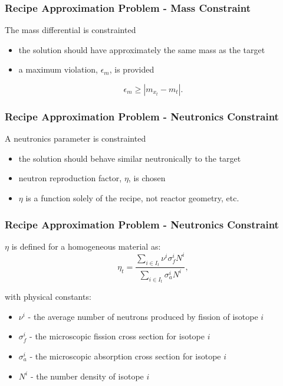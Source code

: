 \begin{frame}[ctb!]
  \frametitle{Recipe Approximation Problem - Mass Constraint}

  The mass differential is constrainted
  \begin{itemize}
    \item the solution should have approximately the same mass as the target
    \item a maximum violation, $\epsilon_{m}$, is provided
  \end{itemize}
  
  \begin{equation}\label{eqs:mass-constraint-simple}
    \epsilon_{m} \geq \left| m_{x_t} - m_{t} \right|.
  \end{equation}
\end{frame}

\begin{frame}[ctb!]
  \frametitle{Recipe Approximation Problem - Neutronics Constraint}

  A neutronics parameter is constrainted
  \begin{itemize}
    \item the solution should behave similar neutronically to the target
    \item neutron reproduction factor, $\eta$, is chosen
    \item $\eta$ is a function solely of the recipe, not reactor geometry, etc.
  \end{itemize}
\end{frame}

\begin{frame}[ctb!]
  \frametitle{Recipe Approximation Problem - Neutronics Constraint}

  $\eta$ is defined for a homogeneous material as:
  \begin{equation}
    \label{eqs:eta_micro}
    \eta_{t} = \frac{\sum_{i \in I_t} \nu^{i} \sigma_{f}^{i} N^{i}} {\sum_{i
        \in I_t} \sigma_{a}^{i} N^{i}},
  \end{equation}

  with physical constants:
  \begin{itemize}
    \item $\nu^{i}$ - the average number of neutrons produced by fission of isotope $i$
    \item $\sigma_{f}^{i}$ - the microscopic fission cross section for isotope $i$
    \item $\sigma_{a}^{i}$ - the microscopic absorption cross section for isotope $i$
    \item $N^i$ - the number density of isotope $i$
  \end{itemize}
\end{frame}

